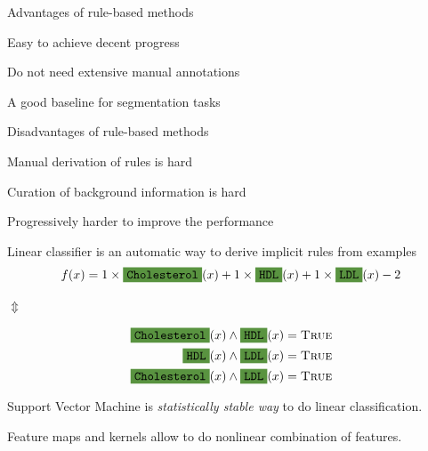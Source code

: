 \documentclass[landscape,footrule]{foils}
\begin{document}

Advantages of rule-based methods
\begin{triangles}
\item Easy to achieve decent progress
\item Do not need extensive manual annotations
\item A good baseline for segmentation tasks   
\end{triangles}
\vspace*{2cm}

Disadvantages of rule-based methods
\begin{triangles}
\item Manual derivation of rules is hard
\item Curation of background information is hard
\item Progressively harder to improve the performance 
\end{triangles}
\vspace*{3ex}



Linear classifier is an automatic way to derive implicit rules from examples
\begin{align*}
f(x)=1\times \colorbox{OliveGreen!80}{\texttt{Cholesterol}}(x) + 1\times \colorbox{OliveGreen!80}{\texttt{HDL}}(x) + 1\times\colorbox{OliveGreen!80}{\texttt{LDL}}(x) - 2 
\end{align*}  
\centerline{$\Updownarrow$}
\begin{align*}
\colorbox{OliveGreen!80}{\texttt{Cholesterol}}(x) \wedge \colorbox{OliveGreen!80}{\texttt{HDL}}(x)&=\textsc{True}\\
\colorbox{OliveGreen!80}{\texttt{HDL}}(x) \wedge \colorbox{OliveGreen!80}{\texttt{LDL}}(x)&=\textsc{True}\\
\colorbox{OliveGreen!80}{\texttt{Cholesterol}}(x) \wedge \colorbox{OliveGreen!80}{\texttt{LDL}}(x)&=\textsc{True}
\end{align*}

Support Vector Machine is \emph{statistically stable way} to do linear classification.

\begin{triangles}
\item Feature maps and kernels allow to do nonlinear combination of features.
\end{triangles}


\end{document}
